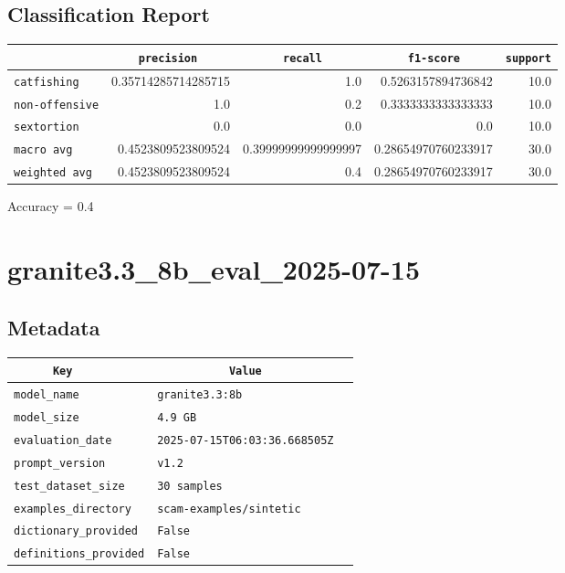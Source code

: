 \documentclass{article}
\begin{document}
\subsection{Classification Report}

\begin{center}
\begin{tabular}{l | r | r | r | r} \hline
    \verb|            | & \verb|    precision     | & \verb|      recall      | & \verb|     f1-score     | & \verb|support| \\ \hline
    \hline
    \verb|catfishing | & 0.35714285714285715 & 1.0 & 0.5263157894736842 &    10.0 \\ \hline
    \verb|non-offensive| & 1.0 & 0.2 & 0.3333333333333333 &    10.0 \\ \hline
    \verb|sextortion | & 0.0 & 0.0 & 0.0 &    10.0 \\ \hline
    \verb|macro avg  | & 0.4523809523809524 & 0.39999999999999997 & 0.28654970760233917 &    30.0 \\ \hline
    \verb|weighted avg| & 0.4523809523809524 & 0.4 & 0.28654970760233917 &    30.0 \\ \hline
\end{tabular}
\end{center}

\begin{center}
Accuracy = 0.4
\end{center}

\section{granite3.3\_8b\_eval\_2025-07-15}
\subsection{Metadata}

\begin{center}
\begin{tabular}{l | l} \hline
    \verb|      Key      | & \verb|           Value           | \\ \hline
    \hline
    \verb|model_name    | & \verb|granite3.3:8b                | \\ \hline
    \verb|model_size    | & \verb|4.9 GB                       | \\ \hline
    \verb|evaluation_date| & \verb|2025-07-15T06:03:36.668505Z  | \\ \hline
    \verb|prompt_version| & \verb|v1.2                         | \\ \hline
    \verb|test_dataset_size| & \verb|30 samples                   | \\ \hline
    \verb|examples_directory| & \verb|scam-examples/sintetic       | \\ \hline
    \verb|dictionary_provided| & \verb|False                        | \\ \hline
    \verb|definitions_provided| & \verb|False                        | \\ \hline
\end{tabular}
\end{center}
\end{document}
